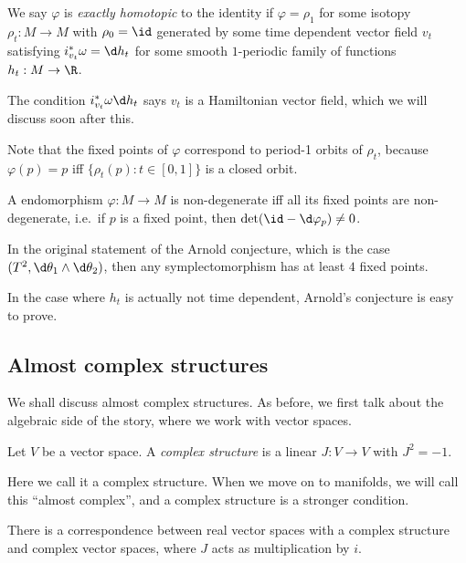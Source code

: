 \documentclass[a4paper]{article}
\begin{document}
\begin{defi}
  We say $\varphi$ is \emph{exactly homotopic} to the identity if $\varphi = \rho_1$ for some isotopy $\rho_t: M \to M$ with $\rho_0 = \id$ generated by some time dependent vector field $v_t$ satisfying $i_{v_t}^* \omega = \d h_t$ for some smooth $1$-periodic family of functions $h_t: M \to \R$.
\end{defi}
The condition $i_{v_t}^* \omega \d h_t$ says $v_t$ is a Hamiltonian vector field, which we will discuss soon after this.

Note that the fixed points of $\varphi$ correspond to period-1 orbits of $\rho_t$, because $\varphi(p) = p$ iff $\{\rho_t(p) : t \in [0, 1]\}$ is a closed orbit.

\begin{defi}
  A endomorphism $\varphi: M \to M$ is non-degenerate iff all its fixed points are non-degenerate, i.e.\ if $p$ is a fixed point, then $\det (\id - \d \varphi_p) \not= 0$.
\end{defi}
\begin{eg}
  In the original statement of the Arnold conjecture, which is the case $(T^2, \d \theta_1 \wedge \d \theta_2)$, then any symplectomorphism has at least $4$ fixed points.
\end{eg}

In the case where $h_t$ is actually not time dependent, Arnold's conjecture is easy to prove.

\subsection{Almost complex structures}
We shall discuss almost complex structures. As before, we first talk about the algebraic side of the story, where we work with vector spaces.
\begin{defi}
  Let $V$ be a vector space. A \emph{complex structure} is a linear $J: V \to V$ with $J^2 = -1$.
\end{defi}
Here we call it a complex structure. When we move on to manifolds, we will call this ``almost complex'', and a complex structure is a stronger condition.

\begin{lemma}
  There is a correspondence between real vector spaces with a complex structure and complex vector spaces, where $J$ acts as multiplication by $i$.
\end{lemma}
\end{document}
